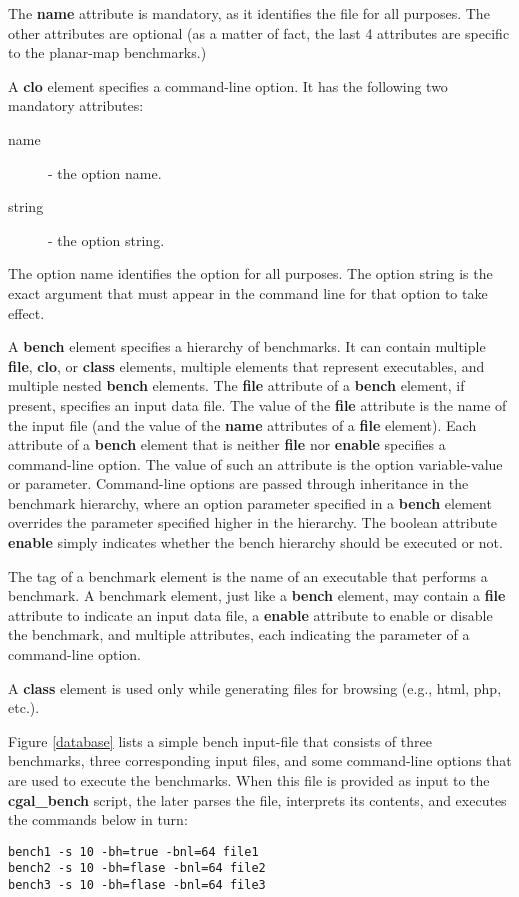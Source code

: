 The \textbf{name} attribute is mandatory, as it identifies the file
for all purposes. The other attributes are optional (as a matter of
fact, the last 4 attributes are specific to the planar-map benchmarks.)

A \textbf{clo} element specifies a command-line option. It has the
following two mandatory attributes:
\begin{description}
\item[name] - the option name.
\item[string] - the option string.
\end{description}

The option name identifies the option for all purposes. The option
string is the exact argument that must appear in the command line for
that option to take effect.

A \textbf{bench} element specifies a hierarchy of benchmarks. It can
contain multiple \textbf{file}, \textbf{clo}, or \textbf{class}
elements, multiple elements that represent executables, and multiple
nested \textbf{bench} elements. The \textbf{file} attribute of a
\textbf{bench} element, if present, specifies an input data file. The
value of the \textbf{file} attribute is the name of the input file
(and the value of the \textbf{name} attributes of a \textbf{file}
element). Each attribute of a \textbf{bench} element that is neither
\textbf{file} nor \textbf{enable} specifies a command-line option. The
value of such an attribute is the option variable-value or
parameter. Command-line options are passed through inheritance in the
benchmark hierarchy, where an option parameter specified in a
\textbf{bench} element overrides the parameter specified higher in the
hierarchy. The boolean attribute \textbf{enable} simply indicates
whether the bench hierarchy should be executed or not.

The tag of a benchmark element is the name of an executable that
performs a benchmark. A benchmark element, just like a \textbf{bench}
element, may contain a \textbf{file} attribute to indicate an input
data file, a \textbf{enable} attribute to enable or disable the
benchmark, and multiple attributes, each indicating the parameter of a
command-line option.

A \textbf{class} element is used only while generating files for
browsing (e.g., html, php, etc.). 

Figure \ref{database} lists a simple bench input-file that consists
of three benchmarks, three corresponding input files, and some
command-line options that are used to execute the benchmarks. When
this file is provided as input to the \textbf{cgal\_bench} script, the
later parses the file, interprets its contents, and executes the
commands below in turn:
\begin{verbatim}
bench1 -s 10 -bh=true -bnl=64 file1
bench2 -s 10 -bh=flase -bnl=64 file2
bench3 -s 10 -bh=flase -bnl=64 file3
\end{verbatim}

